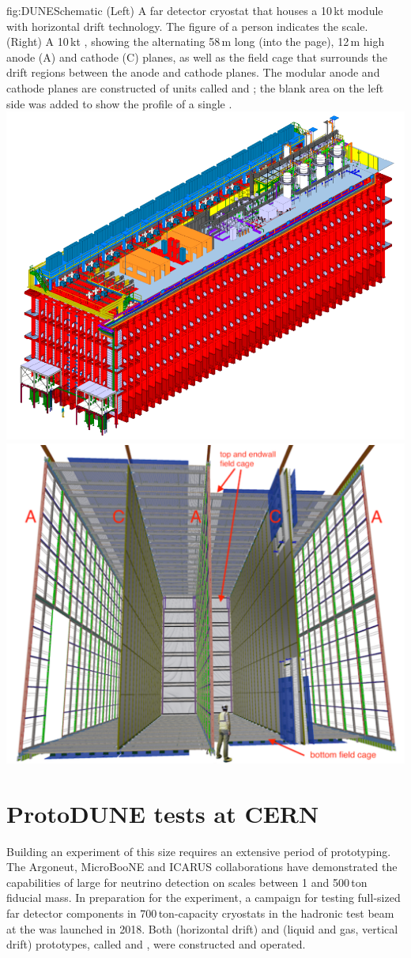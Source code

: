 \documentclass[../main-v1.tex]{subfiles}
\begin{document}
\begin{dunefigure}
{fig:DUNESchematic} %
{(Left) A far detector cryostat that houses a 10\,kt  module with horizontal drift technology. The figure of a person indicates the scale.  (Right) A 10\,kt    , showing the alternating 58\,m long (into the page), 12\,m high anode (A) and cathode (C) planes, as well as the field cage that surrounds the drift regions between the anode and cathode planes. The modular anode and cathode planes are constructed of units called  and ; the blank area on the left side was added to show the profile of a single .}
\includegraphics[height=0.35\textwidth]{graphics/IntroFigures/Fig_03a_cryostat-scale.png}
\includegraphics[height=0.35\textwidth]{graphics/IntroFigures/Fig_03b_DUNESchematic.pdf}
\end{dunefigure}


\section{ProtoDUNE tests at CERN  %
}

Building an experiment of this size requires an extensive period of prototyping.   The Argoneut\cite{Acciarri:2018myr}, MicroBooNE\cite{microboone} and ICARUS\cite{icarus} collaborations have demonstrated the capabilities of large  for neutrino detection on scales between 1 and 500\,ton fiducial mass.  In preparation for the  experiment, a campaign for testing %
full-sized far detector components in 700\,ton-capacity cryostats %
in the  hadronic test beam at the  was launched in 2018.  Both  (horizontal drift) and  (liquid and gas, vertical drift) prototypes, called  and , were constructed and operated. %
\end{document}
